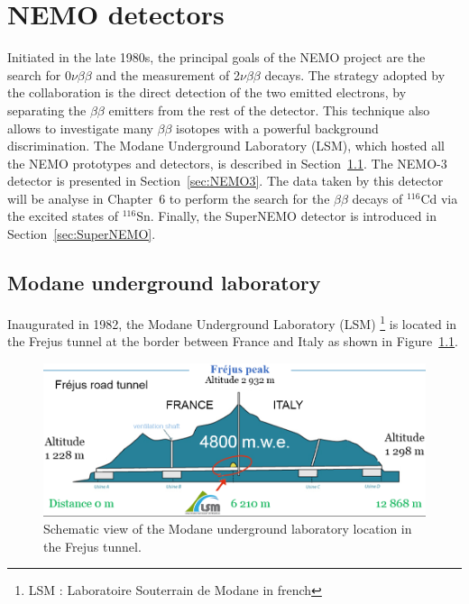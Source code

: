 \documentclass[main.tex]{subfiles}
\begin{document}
\chapter{NEMO detectors}\label{chap:NEMO}
 



\NI Initiated in the late 1980s, the principal goals of the NEMO project are the search for 0$\nu\beta\beta$ and the measurement of 2$\nu\beta\beta$ decays. The strategy adopted by the collaboration is the direct detection of the two emitted electrons, by separating the $\beta\beta$ emitters from the rest of the detector. This technique also allows to investigate many $\beta\beta$ isotopes with a powerful background discrimination. The Modane Underground Laboratory (LSM), which hosted all the NEMO prototypes and detectors, is described in Section~\ref{sec:LSM}. The NEMO-3 detector is presented in Section~\ref{sec:NEMO3}. The data taken by this detector will be analyse in Chapter~6 to perform the search for the $\beta\beta$ decays of $^{\text{116}}$Cd via the excited states of $^{\text{116}}$Sn. Finally, the SuperNEMO detector is introduced in Section~\ref{sec:SuperNEMO}.


\section{Modane underground laboratory}\label{sec:LSM}


\NI Inaugurated in 1982, the Modane Underground Laboratory (LSM) \footnote{LSM : Laboratoire Souterrain de Modane in french} is located in the Frejus tunnel at the border between France and Italy as shown in Figure~\ref{LSMtunnel}.


\begin{figure}[h!]
\begin{center}
\includegraphics[scale=0.35]{pictures/Chap3/LSMtunnel.png}
\caption{Schematic view of the Modane underground laboratory location in the Frejus tunnel.}
\label{LSMtunnel}
\end{center}
\end{figure}
\end{document}
